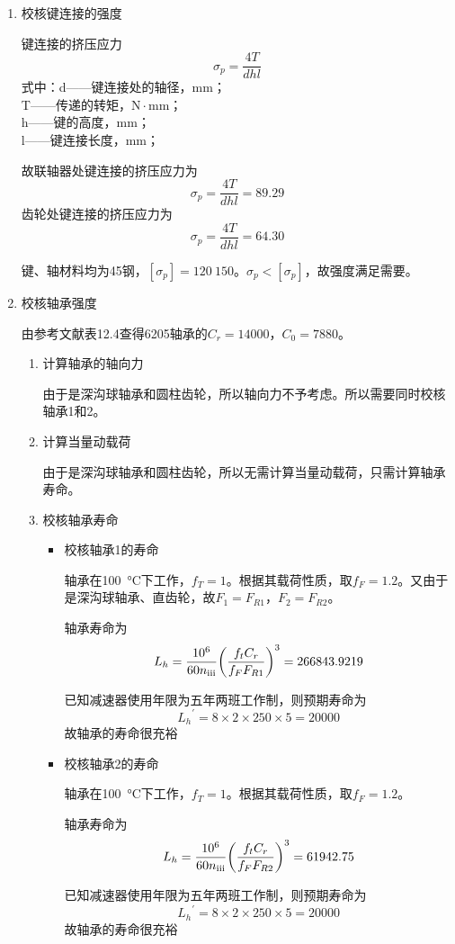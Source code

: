 \begin{enumerate}[A]
	\item 校核键连接的强度
	\par 键连接的挤压应力\\$$\sigma_p=\dfrac{4T}{dhl}$$
	式中：d——键连接处的轴径，mm；\\
	T——传递的转矩，$\mathrm{N}\cdot \mathrm{mm}$；\\
	h——键的高度，mm；\\
	l——键连接长度，mm；
	\par 故联轴器处键连接的挤压应力为$$\sigma_p=\dfrac{4T}{dhl}=89.29$$齿轮处键连接的挤压应力为$$\sigma_p=\dfrac{4T}{dhl}=64.30$$
	\par 键、轴材料均为45钢，$\left[\sigma_p\right]= 120~150$。$\sigma_p<\left[\sigma_p\right]$，故强度满足需要。
	\item 校核轴承强度
	\par 由参考文献\cite{1}表12.4查得6205轴承的$C_r=14000$，$C_0=7880$。
	\begin{enumerate}[a]
		\item 计算轴承的轴向力
		\par 由于是深沟球轴承和圆柱齿轮，所以轴向力不予考虑。所以需要同时校核轴承1和2。
		\item 计算当量动载荷
		\par 由于是深沟球轴承和圆柱齿轮，所以无需计算当量动载荷，只需计算轴承寿命。
		\item 校核轴承寿命
		\begin{itemize}
			\item 校核轴承1的寿命
			\par 轴承在\SI{100}{\degreeCelsius}下工作，$f_T=1$。根据其载荷性质，取$f_F=1.2$。又由于是深沟球轴承、直齿轮，故$F_1=F_{R1}$，$F_2=F_{R2}$。
			\par 轴承寿命为
			$$L_h=\dfrac{10^6}{60n_{\mathrm{\uppercase\expandafter{\romannumeral3}}}}{\left(\dfrac{f_tC_r}{f_FF_{R1}}\right)}^3=266843.9219$$
			\par 已知减速器使用年限为五年两班工作制，则预期寿命为
			$${L_h}^{\prime}=8\times 2\times 250\times 5=20000$$
			故轴承的寿命很充裕
			\item 校核轴承2的寿命
			\par 轴承在\SI{100}{\degreeCelsius}下工作，$f_T=1$。根据其载荷性质，取$f_F=1.2$。
			\par 轴承寿命为
			$$L_h=\dfrac{10^6}{60n_{\mathrm{\uppercase\expandafter{\romannumeral3}}}}{\left(\dfrac{f_tC_r}{f_FF_{R2}}\right)}^3=61942.75$$
			\par 已知减速器使用年限为五年两班工作制，则预期寿命为
			$${L_h}^{\prime}=8\times 2\times 250\times 5=20000$$
			故轴承的寿命很充裕
		\end{itemize}
	\end{enumerate}
\end{enumerate}
